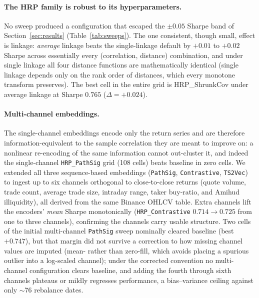 \documentclass[11pt,a4paper]{article}
\begin{document}
\paragraph{The HRP family is robust to its hyperparameters.} No sweep
produced a configuration that escaped the $\pm 0.05$ Sharpe band of
Section~\ref{sec:results} (Table~\ref{tab:sweeps}). The one consistent, though small,
effect is linkage: \emph{average} linkage beats the
\citet{lopezdeprado2016hrp} single-linkage default by $+0.01$ to
$+0.02$ Sharpe across essentially every (correlation, distance)
combination, and under single linkage all four distance functions are
mathematically identical (single linkage depends only on the rank order
of distances, which every monotone transform preserves). The best cell
in the entire grid is HRP\_ShrunkCov under average linkage at Sharpe
$0.765$ ($\Delta=+0.024$).

\paragraph{Multi-channel embeddings.} The single-channel embeddings
encode only the return series and are therefore information-equivalent
to the sample correlation they are meant to improve on: a nonlinear
re-encoding of the same information cannot out-cluster it, and indeed
the single-channel \texttt{HRP\_PathSig} grid (108 cells) beats baseline
in zero cells. We extended all three sequence-based embeddings
(\texttt{PathSig}, \texttt{Contrastive}, \texttt{TS2Vec}) to ingest up
to six channels orthogonal to close-to-close returns (quote volume,
trade count, average trade size, intraday range, taker buy-ratio, and
Amihud illiquidity), all derived from the same Binance OHLCV table.
Extra channels lift the encoders' \emph{mean} Sharpe monotonically
(\texttt{HRP\_Contrastive} $0.714\rightarrow0.725$ from one to three
channels), confirming the channels carry usable structure. Two cells of
the initial multi-channel \texttt{PathSig} sweep nominally cleared
baseline (best $+0.747$), but that margin did not survive a correction
to how missing channel values are imputed (mean- rather than zero-fill,
which avoids placing a spurious outlier into a log-scaled channel);
under the corrected convention no multi-channel configuration clears
baseline, and adding the fourth through sixth channels plateaus or
mildly regresses performance, a bias--variance ceiling against only
$\sim$76 rebalance dates.
\end{document}
